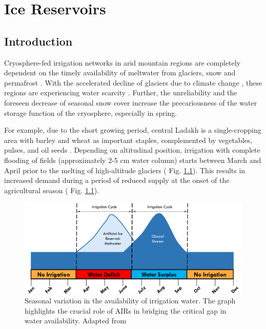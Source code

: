 \chapter{Ice Reservoirs}


\section{Introduction}

Cryosphere-fed irrigation networks in arid mountain regions are completely dependent on the timely availability
of meltwater from glaciers, snow and permafrost \citep{immerzeelImportanceVulnerabilityWorld2020,
farhanHydrologicalRegimesConjunction2015, tveitenGlacierGrowingLocal2007}. With the accelerated decline of
glaciers due to climate change \citep{nusserLocalKnowledgeGlobal2016}, these regions are experiencing water
scarcity \citep{norphelSnowWaterHarvesting2015, mukhopadhyayReevaluationSnowmeltGlacial2015}. Further, the
unreliability and the foreseen decrease of seasonal snow cover \citep{chevuturiClimateChangeLeh2018} increase
the precariousness of the water storage function of the cryosphere, especially in spring.

For example, due to the short growing period, central Ladakh is a single-cropping area with barley and wheat as
important staples, complemented by vegetables, pulses, and oil seeds
\citep{nusserSociohydrologyArtificialGlaciers2019}. Depending on altitudinal position, irrigation with complete
flooding of fields (approximately 2-5 cm water column) starts between March and April prior to the melting of
high-altitude glaciers ( Fig. \ref{fig:irrigation_cycles}). This results in increased demand during a period of
reduced supply at the onset of the agricultural season ( Fig. \ref{fig:irrigation_cycles}).

\begin{figure}[htb]
\centering
\includegraphics[width=\textwidth]{figs/irrigation_cycles.png}
\caption{Seasonal variation in the availability of irrigation water. The graph highlights the crucial role of
AIRs in bridging the critical gap in water availability. Adapted from \cite{nusserLocalKnowledgeGlobal2016}}
\label{fig:irrigation_cycles}
\end{figure}

